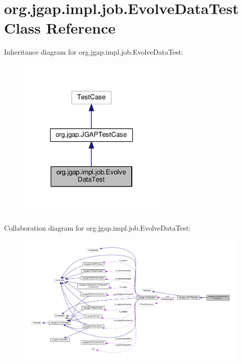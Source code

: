 \hypertarget{classorg_1_1jgap_1_1impl_1_1job_1_1_evolve_data_test}{\section{org.\-jgap.\-impl.\-job.\-Evolve\-Data\-Test Class Reference}
\label{classorg_1_1jgap_1_1impl_1_1job_1_1_evolve_data_test}
}


Inheritance diagram for org.\-jgap.\-impl.\-job.\-Evolve\-Data\-Test\-:
\nopagebreak
\begin{figure}[H]
\begin{center}
\leavevmode
\includegraphics[width=202pt]{classorg_1_1jgap_1_1impl_1_1job_1_1_evolve_data_test__inherit__graph}
\end{center}
\end{figure}


Collaboration diagram for org.\-jgap.\-impl.\-job.\-Evolve\-Data\-Test\-:
\nopagebreak
\begin{figure}[H]
\begin{center}
\leavevmode
\includegraphics[width=350pt]{classorg_1_1jgap_1_1impl_1_1job_1_1_evolve_data_test__coll__graph}
\end{center}
\end{figure}

